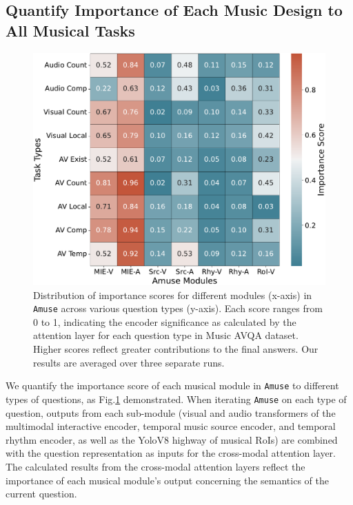 \documentclass[11pt]{article}
\begin{document}
\subsection{Quantify Importance of Each Music Design to All Musical Tasks}
\label{subsec:exp-4}
\begin{figure}[htbp]
\begin{center}
\includegraphics[width=1.0\linewidth]{figs/heatmap_plot.pdf}
\end{center}
\vspace{-0.1cm}
\caption{Distribution of importance scores for different modules (x-axis) in \texttt{Amuse} across various question types (y-axis). Each score ranges from 0 to 1, indicating the encoder significance as calculated by the attention layer for each question type in Music AVQA dataset. Higher scores reflect greater contributions to the final answers. Our results are averaged over three separate runs.}
\label{fig:vis}
\end{figure}
We quantify the importance score of each musical module in \texttt{Amuse} to different types of questions, as Fig.\ref{fig:vis} demonstrated. When iterating \texttt{Amuse} on each type of question, outputs from each sub-module (visual and audio transformers of the multimodal interactive encoder, temporal music source encoder, and temporal rhythm encoder, as well as the YoloV8 highway of musical RoIs) are combined with the question representation as inputs for the cross-modal attention layer. The calculated results from the cross-modal attention layers reflect the importance of each musical module's output concerning the semantics of the current question.
\end{document}
